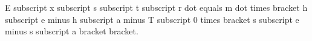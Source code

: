 E subscript x subscript s subscript t subscript r dot equals m dot times bracket h subscript e minus h subscript a minus T subscript 0 times bracket s subscript e minus s subscript a bracket bracket.